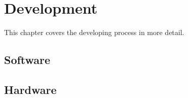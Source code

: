 \chapter{Development}
This chapter covers the developing process in more detail.

\section{Software}

\section{Hardware}

